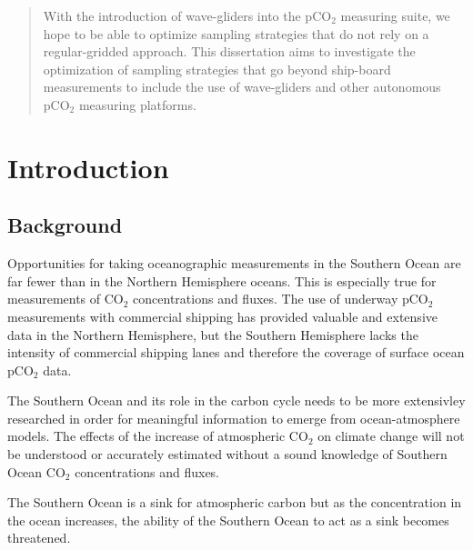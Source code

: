 \documentclass[11pt, a4paper]{article}
\numberwithin{figure}{section}
\numberwithin{table}{section}
\begin{document}
\begin{abstract}
With the introduction of wave-gliders into the pCO$_2$ measuring suite, 
we hope to be able to optimize sampling strategies that do not rely on a 
regular-gridded approach. 
This dissertation aims to investigate the optimization of sampling
strategies that go beyond ship-board measurements to include the use of 
wave-gliders and other autonomous pCO$_2$ measuring platforms.

\end{abstract}

\newpage
\tableofcontents
\newpage

\section{Introduction}
\subsection{Background}
Opportunities for taking oceanographic measurements in the Southern 
Ocean are far fewer than in the Northern Hemisphere oceans. 
This is especially true for measurements of CO${_2}$ concentrations 
and fluxes. 
The use of underway pCO${_2}$ measurements with commercial shipping 
has provided valuable and extensive data in the Northern Hemisphere, 
but the Southern Hemisphere lacks the intensity of commercial shipping 
lanes and therefore the coverage of surface ocean pCO$_2$ data.

The Southern Ocean and its role in the carbon cycle needs to be more 
extensivley researched in order for meaningful information to emerge 
from ocean-atmosphere models. The effects of the increase of 
atmospheric CO${_2}$ on climate change will not be understood or 
accurately estimated without a sound knowledge of Southern Ocean 
CO${_2}$ concentrations and fluxes.

The Southern Ocean is a sink for atmospheric carbon but as the 
concentration in the ocean increases, the ability  of the Southern 
Ocean to act as a sink becomes threatened.
\end{document}
